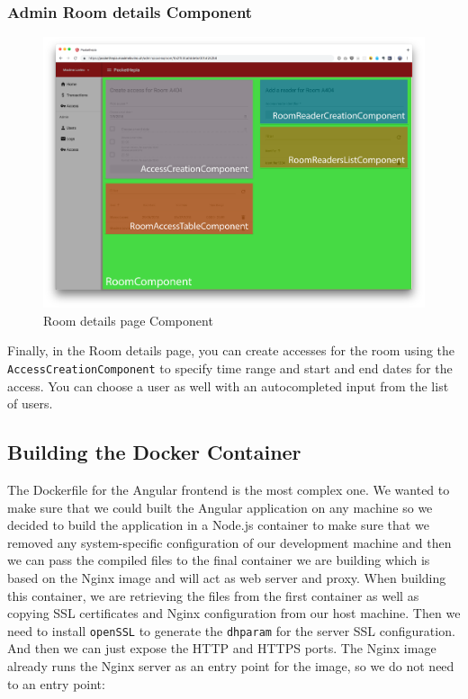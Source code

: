 \documentclass[twoside, openright,11pt,a4paper]{book}
\newenvironment{code}{\captionsetup{type=listing}}{}
\begin{document}
\subsubsection{Admin Room details Component}
\label{room_detail_component}
\begin{figure}[H]
\begin{center}
	\includegraphics[width=\textwidth]{assets/screens/angular/room}
	\caption{Room details page Component}
			\label{room_screen}
\end{center}
\end{figure}

Finally, in the Room details page, you can create accesses for the room using the \verb+AccessCreationComponent+ to specify time range and start and end dates for the access. You can choose a user as well with an autocompleted input from the list of users.
\subsection{Building the Docker Container}
\label{container_angular}
The Dockerfile for the Angular frontend is the most complex one. We wanted to make sure that we could built the Angular application on any machine so we decided to build the application in a Node.js container\cite{docker:hub:node} to make sure that we removed any system-specific configuration of our development machine and then we can pass the compiled files to the final container we are building which is based on the Nginx image\cite{docker:hub:nginx} and will act as web server and proxy. When building this container, we are retrieving the files from the first container as well as copying SSL certificates and Nginx configuration from our host machine. Then we need to install \verb+openSSL+ to generate the \verb+dhparam+\cite{openssl:doc:dhparam} for the server SSL configuration. And then we can just expose the HTTP and HTTPS ports. The Nginx image already runs the Nginx server as an entry point for the image, so we do not need to an entry point:
\begin{code}
\caption{Frontend Nginx/Angular two stages Dockerfile}	
\end{code}
\end{document}
